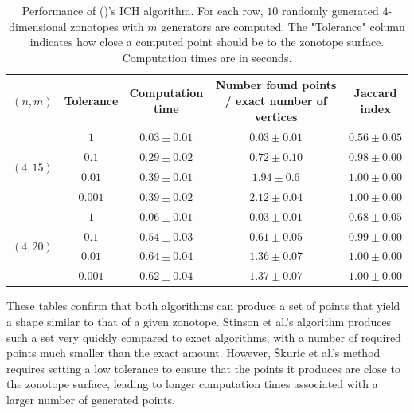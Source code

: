 \begin{table}[!ht]
    \centering
    \begin{tabular}{|c|c|c|c|c|}
    \hline
    $(n,m)$ & Tolerance & \makecell{Computation \\ time} & \makecell{Number found points \\ / exact number of vertices} & \makecell{Jaccard \\ index} \\
    \hline
    \hline

    \multirow{ 4}{*}{$(4,15)$} & $1$ & $0.03\pm 0.01$ & $0.03\pm 0.01$ & $0.56\pm 0.05$  \\
    \cline{2-5}
    & $0.1$ & $0.29\pm 0.02$ & $0.72\pm 0.10$ & $0.98\pm 0.00$ \\
    \cline{2-5}
    & $0.01$ & $0.39\pm 0.01$ & $1.94\pm 0
    .6$ & $\mathbf{1.00\pm 0.00}$\\
    \cline{2-5}
    & $0.001$ & $0.39\pm 0.02$ & $2.12\pm 0.04$ & $\mathbf{1.00\pm 0.00}$ \\
    \hline
    \multirow{ 4}{*}{$(4,20)$}& $1$ & $0.06\pm 0.01$ & $0.03\pm 0.01$ & $0.68\pm 0.05$ \\
    \cline{2-5}
    & $0.1$ & $0.54\pm 0.03$ & $0.61\pm 0.05$ & $0.99\pm 0.00$ \\
    \cline{2-5}
    & $0.01$ & $0.64\pm 0.04$ & $1.36\pm 0.07$ & $\mathbf{1.00\pm 0.00}$ \\
    \cline{2-5}
    & $0.001$ & $0.62\pm 0.04$ & $1.37\pm 0.07$ & $\mathbf{1.00\pm 0.00}$ \\
    \hline
    \end{tabular}
    \caption{Performance of (\cite{skuricOnLineFeasibleWrench2022})'s ICH algorithm. For each row, $10$ randomly generated $4$-dimensional zonotopes with $m$ generators are computed. The "Tolerance" column indicates how close a computed point should be to the zonotope surface. Computation times are in seconds.}
    \label{tab:approx_vertex_set_ich}
\end{table}

These tables confirm that both algorithms can produce a set of points that yield a shape similar to that of a given zonotope. Stinson et al.'s algorithm produces such a set very quickly compared to exact algorithms, with a number of required points much smaller than the exact amount. However, Škuric et al.'s method requires setting a low tolerance to ensure that the points it produces are close to the zonotope surface, leading to longer computation times associated with a larger number of generated points. 

